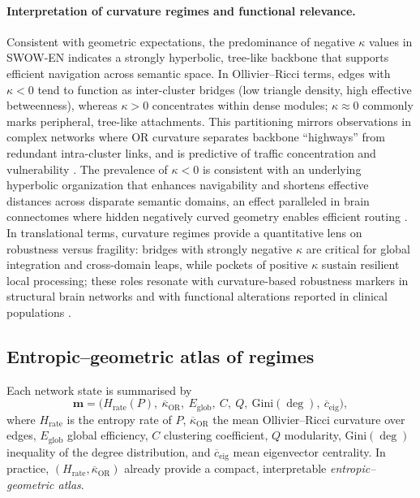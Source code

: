 \documentclass[fleqn,10pt]{wlscirep}
\begin{document}
\paragraph{Interpretation of curvature regimes and functional relevance.}
Consistent with geometric expectations, the predominance of negative $\kappa$ values in SWOW-EN indicates a strongly hyperbolic, tree-like backbone that supports efficient navigation across semantic space. In Ollivier--Ricci terms, edges with $\kappa<0$ tend to function as inter-cluster bridges (low triangle density, high effective betweenness), whereas $\kappa>0$ concentrates within dense modules; $\kappa\approx 0$ commonly marks peripheral, tree-like attachments. This partitioning mirrors observations in complex networks where OR curvature separates backbone “highways” from redundant intra-cluster links, and is predictive of traffic concentration and vulnerability \citep{Sia2019SciRep}. The prevalence of $\kappa<0$ is consistent with an underlying hyperbolic organization that enhances navigability and shortens effective distances across disparate semantic domains, an effect paralleled in brain connectomes where hidden negatively curved geometry enables efficient routing \citep{Allard2020PLOSCB}. In translational terms, curvature regimes provide a quantitative lens on robustness versus fragility: bridges with strongly negative $\kappa$ are critical for global integration and cross-domain leaps, while pockets of positive $\kappa$ sustain resilient local processing; these roles resonate with curvature-based robustness markers in structural brain networks \citep{Farooq2019NatComm} and with functional alterations reported in clinical populations \citep{Elumalai2022SciRep,Simhal2020SciRep}.





\subsection*{Entropic--geometric atlas of regimes}
Each network state is summarised by
\begin{equation}
\mathbf{m}=\big(H_{\mathrm{rate}}(P),\ \overline{\kappa}_{\mathrm{OR}},\ E_{\mathrm{glob}},\ C,\ Q,\ \mathrm{Gini}(\deg),\ \overline{c}_{\mathrm{eig}}\big),
\end{equation}
where $H_{\mathrm{rate}}$ is the entropy rate of $P$, $\overline{\kappa}_{\mathrm{OR}}$ the mean Ollivier--Ricci curvature over edges, $E_{\mathrm{glob}}$ global efficiency, $C$ clustering coefficient, $Q$ modularity, $\mathrm{Gini}(\deg)$ inequality of the degree distribution, and $\overline{c}_{\mathrm{eig}}$ mean eigenvector centrality. In practice, $(H_{\mathrm{rate}},\overline{\kappa}_{\mathrm{OR}})$ already provide a compact, interpretable \emph{entropic--geometric atlas}.
\end{document}
